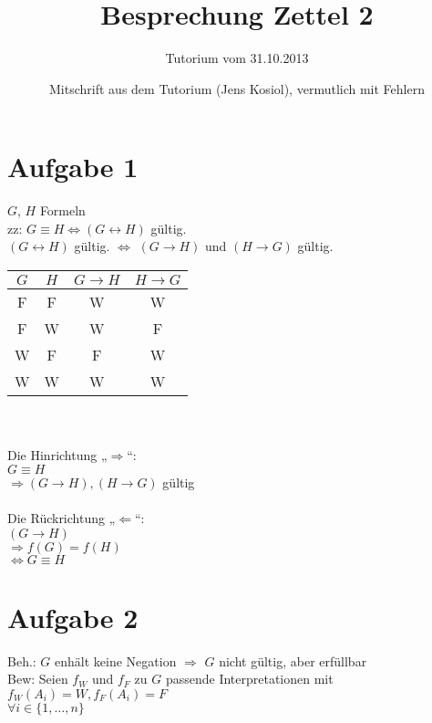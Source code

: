 \documentclass[a4paper]{scrartcl}
\begin{document}
\title{Besprechung Zettel 2}
\subtitle{Tutorium vom 31.10.2013}
\author{Mitschrift aus dem Tutorium (Jens Kosiol), vermutlich mit Fehlern}
\maketitle

\section*{Aufgabe 1}

$G$, $H$ Formeln\\
zz: $G \equiv H \Leftrightarrow (G \leftrightarrow H)$ gültig.\\
$(G \leftrightarrow H)$ gültig. $\Leftrightarrow$ $(G \rightarrow H)$ und $(H \rightarrow G)$ gültig.\\

\begin{tabular}{c|c|c|c}
$G$ & $H$ & $G \rightarrow H$ & $H \rightarrow G$ \\
\hline
F & F & W & W \\
F & W & W & F \\
W & F & F & W \\
W & W & W & W \\
\end{tabular}\\

\noindent\\
Die Hinrichtung „$\Rightarrow$“:\\
$G \equiv H$\\
$\Rightarrow (G \rightarrow H), (H \rightarrow G)$ gültig\\

\noindent\\
Die Rückrichtung „$\Leftarrow$“:\\
$(G \rightarrow H)$\\
$\Rightarrow f(G) = f(H)$\\
$\Leftrightarrow G \equiv H$

\newpage

\section*{Aufgabe 2}

Beh.: $G$ enhält keine Negation $\Rightarrow$ $G$ nicht gültig, aber erfüllbar\\
Bew: Seien $f_W$ und $f_F$ zu $G$ passende Interpretationen mit $f_W(A_i) = W, f_F(A_i) = F$\\
$\forall i \in \{1, …, n\}$\\
\end{document}
